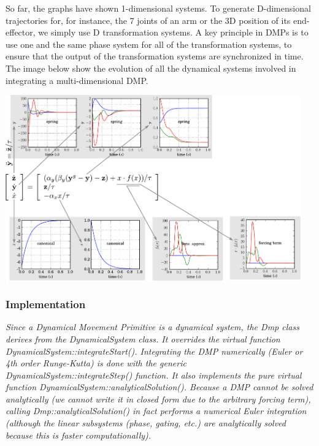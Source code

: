 So far, the graphs have shown 1-\/dimensional systems. To generate D-\/dimensional trajectories for, for instance, the 7 joints of an arm or the 3\+D position of its end-\/effector, we simply use D transformation systems. A key principle in D\+M\+Ps is to use one and the same phase system for all of the transformation systems, to ensure that the output of the transformation systems are synchronized in time. The image below show the evolution of all the dynamical systems involved in integrating a multi-\/dimensional D\+M\+P.


\begin{DoxyImage}
\includegraphics[height=8cm]{dmpplot_ijspeert2002movement-svg}
\caption{The various dynamical systems and forcing terms in multi-\/dimensional D\+M\+Ps.}
\end{DoxyImage}


{\itshape }

{\itshape }\hypertarget{page_dyn_sys_Implementation}{}\subsubsection{Implementation}\label{page_dyn_sys_Implementation}
{\itshape  Since a Dynamical Movement Primitive is a dynamical system, the Dmp class derives from the Dynamical\+System class. It overrides the virtual function Dynamical\+System\+::integrate\+Start(). Integrating the D\+M\+P numerically (Euler or 4th order Runge-\/\+Kutta) is done with the generic Dynamical\+System\+::integrate\+Step() function. It also implements the pure virtual function Dynamical\+System\+::analytical\+Solution(). Because a D\+M\+P cannot be solved analytically (we cannot write it in closed form due to the arbitrary forcing term), calling Dmp\+::analytical\+Solution() in fact performs a numerical Euler integration (although the linear subsystems (phase, gating, etc.) are analytically solved because this is faster computationally).}


